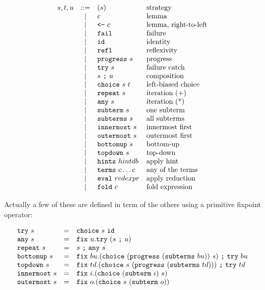 \def\strline#1#2{& \vert & #1 & \text{#2}}
\def\strlinea#1#2#3{& \vert & \str{#1}~#2 & \text{#3}}

\[\begin{array}{lcll}
  s, t, u & ::= & ( s ) & \text{strategy} \\
  \strline{c}{lemma} \\
  \strline{\str{<-}~c}{lemma, right-to-left} \\

  \strline{\str{fail}}{failure} \\
  \strline{\str{id}}{identity} \\
  \strline{\str{refl}}{reflexivity} \\
  \strlinea{progress}{s}{progress} \\
  \strlinea{try}{s}{failure catch} \\

  \strline{s~\str{;}~u}{composition} \\
  \strline{\str{choice}~s~t}{left-biased choice} \\

  \strlinea{repeat}{s}{iteration (+)} \\
  \strlinea{any}{s}{iteration (*)} \\
  
  \strlinea{subterm}{s}{one subterm} \\
  \strlinea{subterms}{s}{all subterms} \\
  \strlinea{innermost}{s}{innermost first} \\
  \strlinea{outermost}{s}{outermost first}\\
  \strlinea{bottomup}{s}{bottom-up} \\
  \strlinea{topdown}{s}{top-down} \\

  \strlinea{hints}{hintdb}{apply hint} \\
  \strlinea{terms}{c \ldots c}{any of the terms}\\
  \strlinea{eval}{redexpr}{apply reduction}\\
  \strlinea{fold}{c}{fold expression}
\end{array}\]

Actually a few of these are defined in term of the others using
a primitive fixpoint operator:

\[\begin{array}{lcl}
  \texttt{try}~s & = & \texttt{choice}~s~\texttt{id} \\
  \texttt{any}~s & = & \texttt{fix}~u. \texttt{try}~(s~\texttt{;}~u) \\
  \texttt{repeat}~s & = & s~\texttt{;}~\texttt{any}~s \\
  \texttt{bottomup}~s & = &
  \texttt{fix}~bu. (\texttt{choice}~(\texttt{progress}~(\texttt{subterms}~bu))~s)~\texttt{;}~\texttt{try}~bu \\
  \texttt{topdown}~s & = &
  \texttt{fix}~td. (\texttt{choice}~s~(\texttt{progress}~(\texttt{subterms}~td)))~\texttt{;}~\texttt{try}~td \\
  \texttt{innermost}~s & = &  \texttt{fix}~i. (\texttt{choice}~(\texttt{subterm}~i)~s) \\
  \texttt{outermost}~s & = &
  \texttt{fix}~o. (\texttt{choice}~s~(\texttt{subterm}~o))
\end{array}\]

